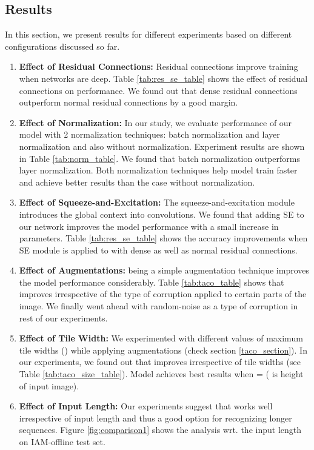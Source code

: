 \documentclass{article}
\begin{document}
\subsection{Results}
In this section, we present results for different experiments based on different configurations discussed so far.
\begin{enumerate}
    \item \textbf{Effect of Residual Connections: }
    Residual connections improve training when networks are deep. Table \ref{tab:res_se_table} shows the effect of residual connections on performance. We found out that dense residual connections outperform normal residual connections by a good margin. 
    \item \textbf{Effect of Normalization: }
    In our study, we evaluate performance of our model with 2 normalization techniques: batch normalization\cite{ioffe2015batch} and layer normalization\cite{ba2016layer} and also without normalization. Experiment results are shown in Table \ref{tab:norm_table}. We found that batch normalization outperforms layer normalization. Both normalization techniques help model train faster and achieve better results than the case without normalization.
    \item \textbf{Effect of Squeeze-and-Excitation: }
    The squeeze-and-excitation module introduces the global context into convolutions. We found that adding SE to our network improves the model performance with a small increase in parameters. Table \ref{tab:res_se_table} shows the accuracy improvements when SE module is applied to  with dense as well as normal residual connections.
    \item \textbf{Effect of  Augmentations: }
     being a simple augmentation technique improves the model performance considerably. Table \ref{tab:taco_table} shows that  improves  irrespective of the type of corruption applied to certain parts of the image. We finally went ahead with random-noise as a type of corruption in rest of our experiments.
    \item \textbf{Effect of Tile Width: }
    We experimented with different values of maximum tile widths () while applying  augmentations (check section \ref{taco_section}). In our experiments, we found out that  improves  irrespective of tile widths (see Table \ref{tab:taco_size_table}). Model achieves best results when = ( is height of input image).
    \item \textbf{Effect of Input Length: }
    Our experiments suggest that  works well irrespective of input length and thus a good option for recognizing longer sequences. Figure \ref{fig:comparison1} shows the  analysis wrt. the input length on IAM-offline test set. 

\end{enumerate}
\end{document}
